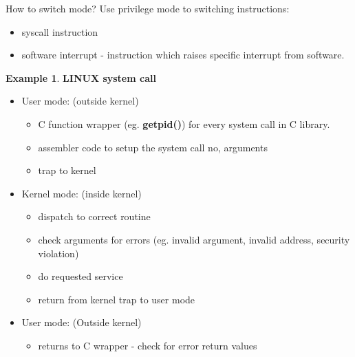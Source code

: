 \documentclass[12pt,a4paper]{article}
\theoremstyle{definition}
\newtheorem{example}{Example}[section]
\newenvironment{myitemize}
{ \begin{itemize}
    \setlength{\itemsep}{5pt}
    \setlength{\parskip}{0pt}
    \setlength{\parsep}{0pt}     }
{ \end{itemize}                  }
\begin{document}
\begin{tcolorbox}
	\textsf{How to switch mode?} Use privilege mode to switching instructions:
	\begin{myitemize}
		\item syscall instruction
		\item software interrupt - instruction which raises specific interrupt from software.
	\end{myitemize}
\end{tcolorbox}

\begin{example}{\textbf{LINUX system call}}
	\begin{myitemize}
		\item User mode: (outside kernel)
		\begin{myitemize}
			\item C function wrapper (eg. \textbf{getpid()}) for every system call in C library.
			\item assembler code to setup the system call no, arguments
			\item trap to kernel	
		\end{myitemize}
		\item Kernel mode: (inside kernel)
		\begin{myitemize}
			\item dispatch to correct routine
			\item check arguments for errors (eg. invalid argument, invalid address, security violation)
			\item do requested service
			\item return from kernel trap to user mode
		\end{myitemize}
		\item User mode: (Outside kernel)
		\begin{myitemize}
			\item returns to C wrapper - check for error return values
		\end{myitemize}
	\end{myitemize}
\end{example}
\end{document}
